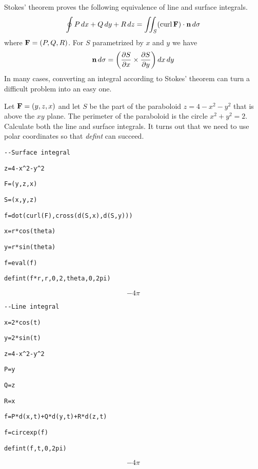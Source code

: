 
\noindent
Stokes' theorem proves the following equivalence of line and surface
integrals.
%
$$\oint P\,dx+Q\,dy+R\,dz
=\int\!\!\!\int_S(\mathop{\rm curl}{\bf F})\cdot{\bf n}\,d\sigma
$$
where ${\bf F}=(P,Q,R)$.
For $S$ parametrized by $x$ and $y$ we have
$${\bf n}\,d\sigma=\left(
{\partial S\over\partial x}\times{\partial S\over\partial y}
\right)dx\,dy$$
In many cases, converting an integral according to
Stokes' theorem can turn a difficult problem into an easy one.

\medskip
\noindent
Let ${\bf F}=(y,z,x)$ and let $S$ be the part of the paraboloid
$z=4-x^2-y^2$
that is above the $xy$ plane.
The perimeter of the paraboloid is the circle $x^2+y^2=2$.
Calculate both the line and surface integrals.
It turns out that we need to use polar coordinates so that {\it defint} can
succeed.

\medskip
\verb$--Surface integral$

\verb$z=4-x^2-y^2$

\verb$F=(y,z,x)$

\verb$S=(x,y,z)$

\verb$f=dot(curl(F),cross(d(S,x),d(S,y)))$

\verb$x=r*cos(theta)$

\verb$y=r*sin(theta)$

\verb$f=eval(f)$

\verb$defint(f*r,r,0,2,theta,0,2pi)$

$$-4\pi$$

\verb$--Line integral$

\verb$x=2*cos(t)$

\verb$y=2*sin(t)$

\verb$z=4-x^2-y^2$

\verb$P=y$

\verb$Q=z$

\verb$R=x$

\verb$f=P*d(x,t)+Q*d(y,t)+R*d(z,t)$

\verb$f=circexp(f)$

\verb$defint(f,t,0,2pi)$

$$-4\pi$$

